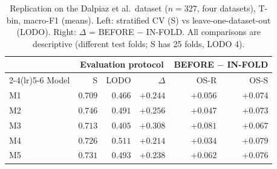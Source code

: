 \begin{table}[t]
\centering
\caption{Replication on the Dalpiaz et al.\ dataset ($n=327$, four datasets), T-bin, macro-F1 (means). Left: stratified CV (S) vs leave-one-dataset-out (LODO). Right: $\Delta$ = BEFORE $-$ IN-FOLD. All comparisons are descriptive (different test folds; S has 25 folds, LODO 4).}
\label{tab:dalpiaz}
\small
\setlength{\tabcolsep}{4pt}
\begin{tabular}{lrrrrr}
\toprule
& \multicolumn{3}{c}{Evaluation protocol} & \multicolumn{2}{c}{BEFORE $-$ IN-FOLD} \\
\cmidrule(lr){2-4}\cmidrule(lr){5-6}
Model & S & LODO & $\Delta$ & OS-R & OS-S \\
\midrule
M1 & $0.709$ & $0.466$ & $+0.244$ & $+0.056$ & $+0.074$ \\
M2 & $0.746$ & $0.491$ & $+0.256$ & $+0.047$ & $+0.073$ \\
M3 & $0.713$ & $0.405$ & $+0.308$ & $+0.081$ & $+0.067$ \\
M4 & $0.726$ & $0.511$ & $+0.214$ & $+0.034$ & $+0.079$ \\
M5 & $0.731$ & $0.493$ & $+0.238$ & $+0.062$ & $+0.076$ \\
\bottomrule
\end{tabular}
\end{table}
